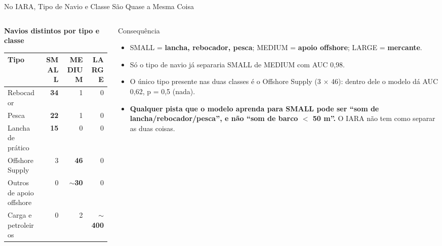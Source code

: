 \documentclass[aspectratio=169]{beamer}
\newcommand{\cahi}[1]{\cellcolor{green!30}\textbf{#1}}
\begin{document}
\begin{frame}{No IARA, Tipo de Navio e Classe São Quase a Mesma Coisa}
    \footnotesize
    \begin{columns}[T]
        \begin{column}{0.48\textwidth}
            \centering
            \scriptsize
            \textbf{Navios distintos por tipo e classe}\\[3pt]
            \setlength{\tabcolsep}{3pt}
            \begin{tabular}{@{}lrrr@{}}
                \toprule
                Tipo & SMALL & MEDIUM & LARGE \\
                \midrule
                Rebocador & \cahi{34} & 1 & 0 \\
                Pesca & \cahi{22} & 1 & 0 \\
                Lancha de prático & \cahi{15} & 0 & 0 \\
                Offshore Supply & 3 & \cahi{46} & 0 \\
                Outros de apoio offshore & 0 & \cahi{$\sim$30} & 0 \\
                Carga e petroleiros & 0 & 2 & \cahi{$\sim$400} \\
                \bottomrule
            \end{tabular}
        \end{column}
        \begin{column}{0.50\textwidth}
            \begin{block}{\small Consequência}
                \scriptsize
                \begin{itemize}
                    \setlength{\itemsep}{2pt}
                    \item SMALL = \textbf{lancha, rebocador, pesca}; MEDIUM = \textbf{apoio offshore}; LARGE = \textbf{mercante}.
                    \item Só o tipo de navio já separaria SMALL de MEDIUM com AUC 0,98.
                    \item O único tipo presente nas duas classes é o Offshore Supply (3 $\times$ 46): dentro dele o modelo dá AUC 0,62, p = 0,5 (nada).
                    \item \textbf{Qualquer pista que o modelo aprenda para SMALL pode ser ``som de lancha/rebocador/pesca'', e não ``som de barco $<$ 50 m''.} O IARA não tem como separar as duas coisas.
                \end{itemize}
            \end{block}
        \end{column}
    \end{columns}
\end{frame}
\end{document}
